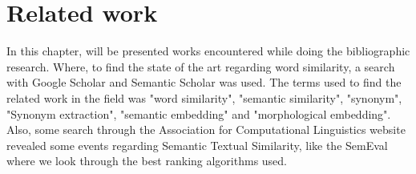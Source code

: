 





\section{Related work}\label{chap:relatedwork}



In this chapter, will be presented works encountered while doing the bibliographic research. Where, to find the state of the art regarding word similarity, a search with Google Scholar and Semantic Scholar was used. The terms used to find the related work in the field was "word similarity", "semantic similarity", "synonym", "Synonym extraction", "semantic embedding" and "morphological embedding". Also, some search through the Association for Computational Linguistics website revealed some events regarding Semantic Textual Similarity, like the SemEval where we look through the best ranking algorithms used.








% 




